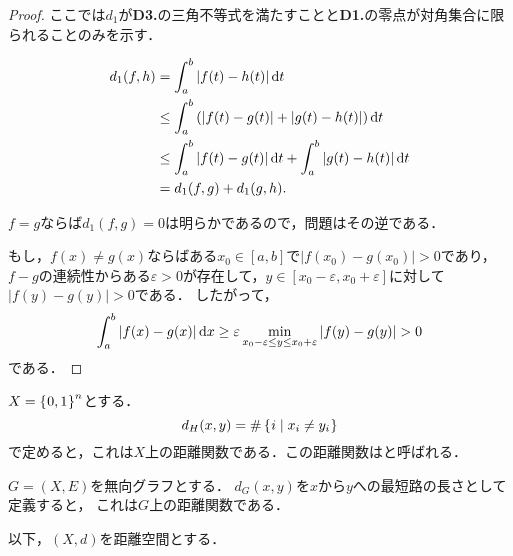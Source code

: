 \documentclass[uplatex]{jsarticle}
\begin{document}
\begin{proof}
    ここでは$d_{1}$が\textbf{D3.}の三角不等式を満たすことと\textbf{D1.}の零点が対角集合に限られることのみを示す．\par
    \midashi{[D3.について]}
    \begin{align*}
        d_{1} (f,h)
        &= \int_{a}^{b} \left| f(t) - h(t) \right| \mathrm{d}t \\
      &\le \int_{a}^{b} \left( \left| f(t) - g(t) \right| + \left| g(t) - h(t) \right| \right) \mathrm{d}t \\
      &\le \int_{a}^{b} \left| f(t) - g(t) \right| \mathrm{d}t +  \int_{a}^{b} \left| g(t) - h(t) \right| \mathrm{d}t \\
        &= d_{1} (f,g) + d_{1} (g,h).
    \end{align*}
    \midashi{[零点が対角集合に限られることについて]}\par
    $f = g$ならば$d_{1} (f,g) = 0$は明らかであるので，問題はその逆である．

    もし，$f(x) \neq g(x)$ならばある$x_{0} \in [a,b]$で$\left| f(x_{0}) - g(x_{0}) \right|> 0$であり，
    $f-g$の連続性からある$\varepsilon > 0$が存在して，$y \in [x_{0} - \varepsilon, x_{0} + \varepsilon]$に対して
    $\left| f(y) - g(y) \right| > 0$である．
    したがって，
    \begin{equation*}
        \int_{a}^{b} \left| f(x) - g(x) \right| \mathrm{d}x \ge \varepsilon \min_{x_{0} - \varepsilon \le y \le x_{0} + \varepsilon} \left| f(y) - g(y) \right| > 0
    \end{equation*}
    である．
\end{proof}

\begin{rei}
    $X = \Set{\hspace{-1.8pt} 0,1 \hspace{-1.8pt}}^{n}$とする．
    \begin{equation}
        d_{H}(x,y) = \# \Set{\hspace{-1.8pt} i | x_{i} \neq y_{i} \hspace{-1.8pt}}
    \end{equation}
    で定めると，これは$X$上の距離関数である．この距離関数はと呼ばれる．
\end{rei}

\begin{rei}
    $G = (X,E)$を無向グラフとする．
    $d_{G}(x,y)$を$x$から$y$への最短路の長さとして定義すると，
    これは$G$上の距離関数である．
\end{rei}

以下，$(X,d)$を距離空間とする．
\end{document}
